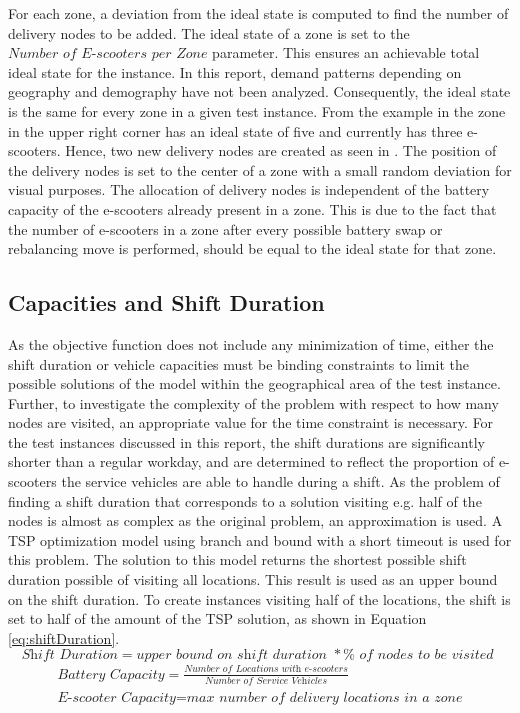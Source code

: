 For each zone, a deviation from the ideal state is computed to find the number of delivery nodes to be added. The ideal state of a zone is set to the $\textit{Number of E-scooters per Zone}$ parameter. This ensures an achievable total ideal state for the instance. In this report, demand patterns depending on geography and demography have not been analyzed. Consequently, the ideal state is the same for every zone in a given test instance. From the example in  the zone in the upper right corner has an ideal state of five and currently has three e-scooters. Hence, two new delivery nodes are created as seen in . The position of the delivery nodes is set to the center of a zone with a small random deviation for visual purposes. The allocation of delivery nodes is independent of the battery capacity of the e-scooters already present in a zone. This is due to the fact that the number of e-scooters in a zone after every possible battery swap or rebalancing move is performed, should be equal to the ideal state for that zone. 

\subsection{Capacities and Shift Duration}
As the objective function does not include any minimization of time, either the shift duration or vehicle capacities must be binding constraints to limit the possible solutions of the model within the geographical area of the test instance. Further, to investigate the complexity of the problem with respect to how many nodes are visited, an appropriate value for the time constraint is necessary. For the test instances discussed in this report, the shift durations are significantly shorter than a regular workday, and are determined to reflect the proportion of e-scooters the service vehicles are able to handle during a shift. As the problem of finding a shift duration that corresponds to a solution visiting e.g. half of the nodes is almost as complex as the original problem, an approximation is used. A TSP optimization model using branch and bound with a short timeout is used for this problem. The solution to this model returns the shortest possible shift duration possible of visiting all locations. This result is used as an upper bound on the shift duration. To create instances visiting half of the locations, the shift is set to half of the amount of the TSP solution, as shown in Equation \eqref{eq:shiftDuration}. 
\begin{equation}
    \textit{Shift Duration} = \textit{upper bound on shift duration } * \% \textit{ of nodes to be visited }\label{eq:shiftDuration}
\end{equation}
\begin{equation}
    \begin{gathered}
        \textit{Battery Capacity} = \frac{\textit{Number of Locations with e-scooters}}{\textit{Number of Service Vehicles}}\\
        \textit{E-scooter Capacity} = \textit{max number of delivery locations in a zone}
    \end{gathered}\label{eq:capacities}
\end{equation}

